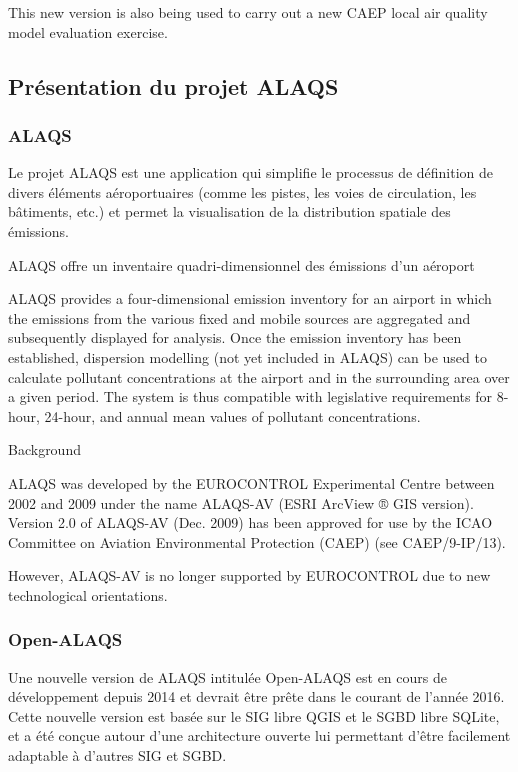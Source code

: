 \documentclass[a4paper,12pt,twoside]{article}
\begin{document}
    This new version is also being used to carry out a new CAEP local air quality model evaluation exercise.
    \subsection{Présentation du projet ALAQS}
    \subsubsection{ALAQS}
    Le projet \gls{ALAQS} est une application qui simplifie le processus de définition de divers éléments aéroportuaires (comme les pistes, les voies de circulation, les bâtiments, etc.) et permet la visualisation de la distribution spatiale des émissions.
    
    \gls{ALAQS} offre un inventaire quadri-dimensionnel des émissions d'un aéroport 
    
    ALAQS provides a four-dimensional emission inventory for an airport in which the emissions from the various fixed and mobile sources are aggregated and subsequently displayed for analysis. Once the emission inventory has been established, dispersion modelling (not yet included in ALAQS) can be used to calculate pollutant concentrations at the airport and in the surrounding area over a given period. The system is thus compatible with legislative requirements for 8-hour, 24-hour, and annual mean values of pollutant concentrations.
    
    Background
    
    ALAQS was developed by the EUROCONTROL Experimental Centre between 2002 and 2009 under the name ALAQS-AV (ESRI ArcView ® GIS version). Version 2.0 of ALAQS-AV (Dec. 2009) has been approved for use by the ICAO Committee on Aviation Environmental Protection (CAEP) (see CAEP/9-IP/13).
    
    However, ALAQS-AV is no longer supported by EUROCONTROL due to new technological orientations.
    
    \subsubsection{Open-ALAQS}
    Une nouvelle version de \gls{ALAQS} intitulée \gls{Open-ALAQS} est en cours de développement depuis 2014 et devrait être prête dans le courant de l'année 2016.\\
    Cette nouvelle version est basée sur le \gls{SIG} libre \gls{QGIS} et le \gls{SGBD} libre \gls{SQLite}, et a été conçue autour d'une architecture ouverte lui permettant d'être facilement adaptable à d'autres \gls{SIG} et \gls{SGBD}.
    
\end{document}
